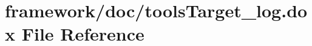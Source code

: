 \hypertarget{tools_target__log_8dox}{}\section{framework/doc/tools\+Target\+\_\+log.dox File Reference}
\label{tools_target__log_8dox}
